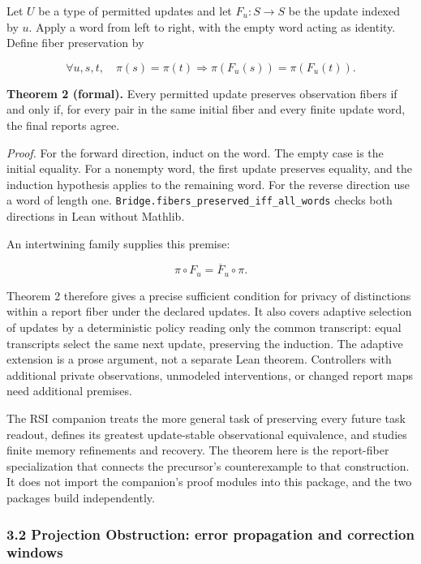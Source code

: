 \documentclass[
  10pt,
]{article}
\begin{document}
Let \protect\hypertarget{math-E0015-0024}{}{\(U\)} be a type of permitted updates and let \protect\hypertarget{math-E0016-0025}{}{\(F_u:S\to S\)} be the update indexed by \protect\hypertarget{math-E0017-0026}{}{\(u\)}. Apply a word from left to right, with the empty word acting as identity. Define fiber preservation by

\protect\hypertarget{math-E0018-0027}{}{\[
\forall u,s,t,\quad \pi(s)=\pi(t)\Longrightarrow
\pi(F_u(s))=\pi(F_u(t)).
\]}

\textbf{Theorem 2 (formal).} Every permitted update preserves observation fibers if and only if, for every pair in the same initial fiber and every finite update word, the final reports agree.

\emph{Proof.} For the forward direction, induct on the word. The empty case is the initial equality. For a nonempty word, the first update preserves equality, and the induction hypothesis applies to the remaining word. For the reverse direction use a word of length one. \texttt{Bridge.fibers\_preserved\_iff\_all\_words} checks both directions in Lean without Mathlib.

An intertwining family supplies this premise:

\protect\hypertarget{math-E0019-0028}{}{\[
\pi\circ F_u=\overline F_u\circ\pi.
\]}

Theorem 2 therefore gives a precise sufficient condition for privacy of distinctions within a report fiber under the declared updates. It also covers adaptive selection of updates by a deterministic policy reading only the common transcript: equal transcripts select the same next update, preserving the induction. The adaptive extension is a prose argument, not a separate Lean theorem. Controllers with additional private observations, unmodeled interventions, or changed report maps need additional premises.

The RSI companion treats the more general task of preserving every future task readout, defines its greatest update-stable observational equivalence, and studies finite memory refinements and recovery. The theorem here is the report-fiber specialization that connects the precursor's counterexample to that construction. It does not import the companion's proof modules into this package, and the two packages build independently.

\subsubsection{3.2 Projection Obstruction: error propagation and correction windows}\label{projection-obstruction-error-propagation-and-correction-windows}
\end{document}
